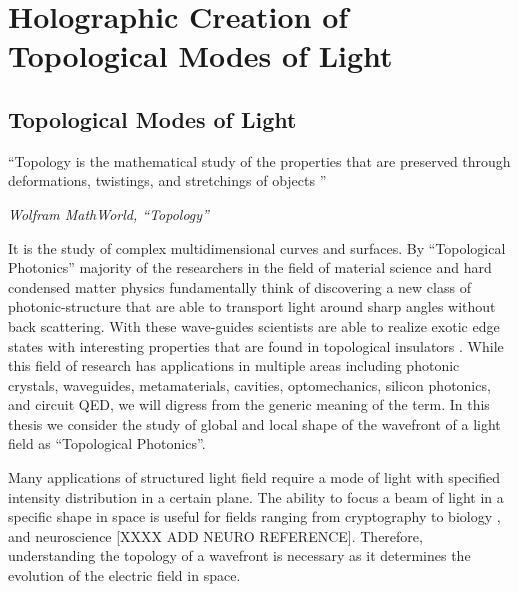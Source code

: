 \chapter{Holographic Creation of Topological Modes of Light}
\label{ch:topological_modes}

\section{Topological Modes of Light}

\setlength{\epigraphwidth}{0.8\textwidth}
\epigraph{``Topology is the mathematical study of the properties that are preserved through deformations, twistings, and stretchings of objects \cite{topology}''}{\textit{Wolfram MathWorld, ``Topology''}}

It is the study of complex multidimensional curves and surfaces. By ``Topological Photonics'' \cite{leykam2016, Zhou_2017} majority of the researchers in the field of material science and hard condensed matter physics fundamentally think of discovering a new class of photonic-structure \cite{Barik666} that are able to transport light around sharp angles without back scattering. With these wave-guides scientists are able to realize exotic edge states with interesting properties that are found  in topological insulators \cite{hsieh2008, haldane20107}. While this field of research has applications in multiple areas \cite{ozawa2019} including photonic crystals, waveguides, metamaterials, cavities, optomechanics, silicon photonics, and circuit QED, we will digress from the generic meaning of the term. In this thesis we consider the study of global and local shape of the wavefront of a light field as ``Topological Photonics''. 

Many applications of structured light field require a mode of light with specified intensity distribution in a certain plane. The ability to focus a beam of light in a specific shape in space is useful for fields ranging from cryptography \cite{Horstmeyer2013, Horstmeyer2013cleo} to biology \cite{wang2012, Papadopoulos:12}, and neuroscience [XXXX ADD NEURO REFERENCE]. Therefore, understanding the topology of a wavefront is necessary as it determines the evolution of the electric field in space. 



